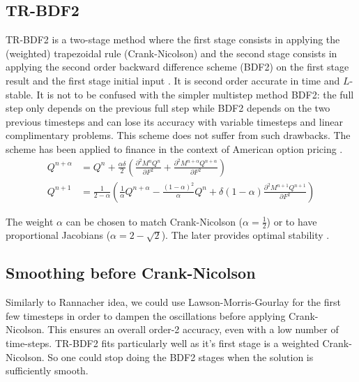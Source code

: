 \documentclass[]{rAMF2e}
\begin{document}
\subsection{TR-BDF2}
TR-BDF2 is a two-stage method where the first stage consists in applying the (weighted) trapezoidal rule (Crank-Nicolson) and the second stage consists in applying the second order backward difference scheme (BDF2) on the first stage result and the first stage initial input \citep{bank1985transient, Le07}. It is second order accurate in time and $L$-stable. It is not to be confused with the simpler multistep method BDF2: the full step only depends on the previous full step while BDF2 depends on the two previous timesteps and can lose its accuracy \citep{windcliff2001shout} with variable timesteps and linear complimentary problems. This scheme does not suffer from such drawbacks. The scheme has been applied to finance in the context of American option pricing \citep{floc2013tr}.
\begin{align}
Q^{n+\alpha} &= Q^n + \frac{\alpha \delta}{2}\left(\frac{\partial^2 M^{n} Q^n}{\partial F^2}+\frac{\partial^2 M^{n+\alpha} Q^{n+\alpha}}{\partial F^2}\right)\\
Q^{n+1} &= \frac{1}{2-\alpha}\left(\frac{1}{\alpha} Q^{n+\alpha} - \frac{(1-\alpha)^2}{\alpha}Q^n + \delta(1-\alpha)\frac{\partial^2 M^{n+1} Q^{n+1}}{\partial F^2}\right)
\end{align}

The weight $\alpha$ can be chosen to match Crank-Nicolson ($\alpha=\frac{1}{2}$) or to have proportional Jacobians ($\alpha = 2-\sqrt{2}$). The later provides optimal stability \citep{dharmaraja2009optimal}. 

\subsection{Smoothing before Crank-Nicolson}
Similarly to Rannacher idea, we could use Lawson-Morris-Gourlay for the first few timesteps in order to dampen the oscillations before applying Crank-Nicolson. This ensures an overall order-2 accuracy, even with a low number of time-steps. TR-BDF2 fits particularly well as it's first stage is a weighted Crank-Nicolson. So one could stop doing the BDF2 stages when the solution is sufficiently smooth. 
\end{document}
